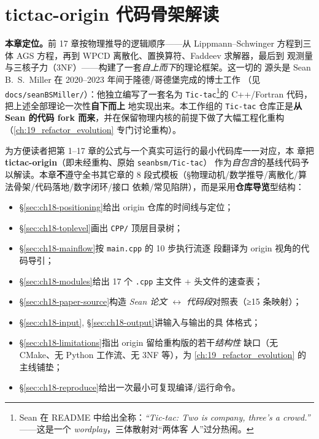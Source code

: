 
\chapter{tictac-origin 代码骨架解读}
\label{ch:18_origin_codebase}

\textbf{本章定位。}\;前 17 章按物理推导的逻辑顺序——从 Lippmann--Schwinger
方程到三体 AGS 方程，再到 WPCD 离散化、置换算符、Faddeev 求解器，最后到
观测量与三核子力（3NF）——构建了一套\emph{自上而下}的理论框架。这一切的
源头是 Sean B.~S.\ Miller 在 2020--2023 年间于隆德/哥德堡完成的博士工作
（见 \texttt{docs/seanBSMiller/}）：他独立编写了一套名为
\texttt{Tic-tac}\footnote{Sean 在 README 中给出全称：\textit{“Tic-tac: Two
is company, three's a crowd.”} ——这是一个 \emph{wordplay}，三体散射对“两体客
人”过分热闹。}的 C++/Fortran 代码，把上述全部理论一次性\textbf{自下而上}
地实现出来。本工作组的 \texttt{Tic-tac} 仓库正是\textbf{从 Sean 的代码 fork
而来}，并在保留物理内核的前提下做了大幅工程化重构（\cref{ch:19_refactor_evolution}
专门讨论重构）。

为方便读者把第 1--17 章的公式与一个真实可运行的最小代码库一一对应，本
章把 \textbf{tictac-origin}（即未经重构、原始 \texttt{seanbsm/Tic-tac}）
作为\emph{自包含}的基线代码予以解读。本章\textbf{不}遵守全书其它章的
8 段式模板（§物理动机/数学推导/离散化/算法骨架/代码落地/数字闭环/接口
依赖/常见陷阱），而是采用\textbf{仓库导览}型结构：
\begin{itemize}
  \item §\ref{sec:ch18-positioning}\;给出 origin 仓库的时间线与定位；
  \item §\ref{sec:ch18-toplevel}\;画出 \texttt{CPP/} 顶层目录树；
  \item §\ref{sec:ch18-mainflow}\;按 \texttt{main.cpp} 的 10 步执行流逐
        段翻译为 origin 视角的代码导引；
  \item §\ref{sec:ch18-modules}\;给出 17 个 \texttt{.cpp} 主文件 +
        头文件的速查表；
  \item §\ref{sec:ch18-paper-source}\;构造 \emph{Sean 论文 $\leftrightarrow$
        代码段}对照表（≥15 条映射）；
  \item §\ref{sec:ch18-input}, §\ref{sec:ch18-output}\;讲输入与输出的具
        体格式；
  \item §\ref{sec:ch18-limitations}\;指出 origin 留给重构版的若干\emph{结构性}
        缺口（无 CMake、无 Python 工作流、无 3NF 等），为
        \cref{ch:19_refactor_evolution} 的主线铺垫；
  \item §\ref{sec:ch18-reproduce}\;给出一次最小可复现编译/运行命令。
\end{itemize}

